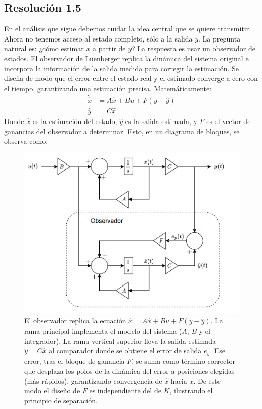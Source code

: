 \documentclass[
  11pt,
  letterpaper,
   addpoints,
  answers
  ]{exam}
\begin{document}
\begin{questions}
\begin{solution}
  \subsection*{Resolución 1.5}
  En el análisis que sigue debemos cuidar la idea central que se quiere transmitir. Ahora no tenemos acceso al estado completo, sólo a la salida $y$. La pregunta natural es: ¿cómo estimar $x$ a partir de $y$? La respuesta es usar un observador de estados. El observador de Luenberger replica la dinámica del sistema original e incorpora la información de la salida medida para corregir la estimación. Se diseña de modo que el error entre el estado real y el estimado converge a cero con el tiempo, garantizando una estimación precisa. Matemáticamente:
  \begin{align}
    \dot{\hat x} &= A\hat x + Bu + F(y - \hat y) \\
    \hat y &= C\hat x
  \end{align}
  Donde $\hat x$ es la estimación del estado, $\hat y$ es la salida estimada, y $F$ es el vector de ganancias del observador a determinar. Esto, en un diagrama de bloques, se observa como:
    \begin{figure}[H]\centering
    \includegraphics[width=.9\textwidth]{../figures/Auxiliar_4_3.png}
    \caption{El observador replica la ecuación $\dot{\hat x}=A\hat x + Bu + F(y-\hat y)$. La rama principal implementa el modelo del sistema ($A$, $B$ y el integrador). La rama vertical superior lleva la salida estimada $\hat y = C\hat x$ al comparador donde se obtiene el error de salida $e_y$. Ese error, tras el bloque de ganancia $F$, se suma como término corrector que desplaza los polos de la dinámica del error a posiciones elegidas (más rápidos), garantizando convergencia de $\hat x$ hacia $x$. De este modo el diseño de $F$ es independiente del de $K$, ilustrando el principio de separación.}

\end{figure}
\end{solution}
\end{questions}
\end{document}
